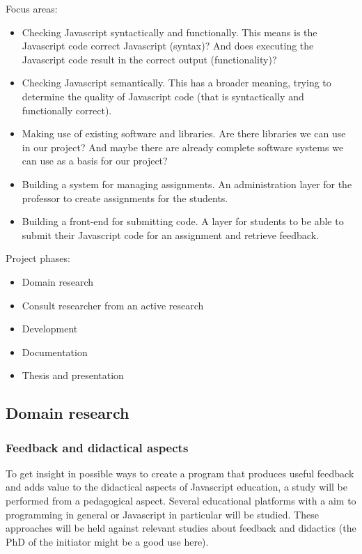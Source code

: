 \documentclass{article}
\begin{document}
\begin{itemize}
Focus areas:
\begin{itemize}
  \item Checking Javascript syntactically and functionally. This means is the Javascript code correct Javascript (syntax)? And does executing the Javascript code result in the correct output (functionality)?
  \item Checking Javascript semantically. This has a broader meaning, trying to determine the quality of Javascript code (that is syntactically and functionally correct).
  \item Making use of existing software and libraries. Are there libraries we can use in our project? And maybe there are already complete software systems we can use as a basis for our project?
  \item Building a system for managing assignments. An administration layer for the professor to create assignments for the students.
  \item Building a front-end for submitting code. A layer for students to be able to submit their Javascript code for an assignment and retrieve feedback.
\end{itemize}

Project phases:
\begin{itemize}
  \item Domain research
  \item Consult researcher from an active research
  \item Development
  \item Documentation
  \item Thesis and presentation
\end{itemize}


\subsection{Domain research}

\subsubsection{Feedback and didactical aspects}
To get insight in possible ways to create a program that produces useful feedback and adds value to the didactical aspects of Javascript education, a study will be performed from a pedagogical aspect. Several educational platforms with a aim to programming in general or Javascript in particular will be studied. These approaches will be held against relevant studies about feedback and didactics (the PhD of the initiator might be a good use here).

\end{itemize}
\end{document}
